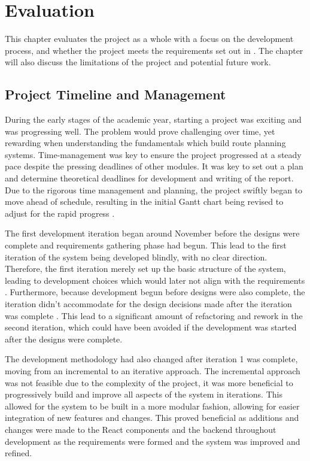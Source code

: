\chapter{Evaluation}
\label{chap:evaluation}

This chapter evaluates the project as a whole with a focus on the development process, and whether the project meets the requirements set out in . The chapter will also discuss the limitations of the project and potential future work.

\section{Project Timeline and Management}
\label{evaluation:timeline-management}

During the early stages of the academic year, starting a project was exciting and was progressing well. The problem would prove challenging over time, yet rewarding when understanding the fundamentals which build route planning systems. Time-management was key to ensure the project progressed at a steady pace despite the pressing deadlines of other modules. It was key to set out a plan and determine theoretical deadlines for development and writing of the report. Due to the rigorous time management and planning, the project swiftly began to move ahead of schedule, resulting in the initial Gantt chart  being revised to adjust for the rapid progress .

The first development iteration began around November before the designs were complete and requirements gathering phase had begun. This lead to the first iteration of the system being developed blindly, with no clear direction. Therefore, the first iteration merely set up the basic structure of the system, leading to development choices which would later not align with the requirements . Furthermore, because development begun before designs were also complete, the iteration didn't accommodate for the design decisions made after the iteration was complete . This lead to a significant amount of refactoring and rework in the second iteration, which could have been avoided if the development was started after the designs were complete.

The development methodology had also changed after iteration 1 was complete, moving from an incremental to an iterative approach. The incremental approach was not feasible due to the complexity of the project, it was more beneficial to progressively build and improve all aspects of the system in iterations. This allowed for the system to be built in a more modular fashion, allowing for easier integration of new features and changes. This proved beneficial as additions and changes were made to the React components and the backend throughout development as the requirements were formed and the system was improved and refined.

